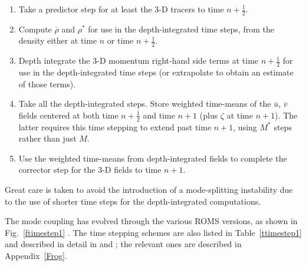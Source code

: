 \begin{enumerate}
  \item Take a predictor step for at least the 3-D tracers to time
  $n+\frac{1}{2}$.
  \item Compute $\overline{\rho}$ and
$\rho^*$ for use in the depth-integrated time steps, from the density
either at time $n$ or time $n+\frac{1}{2}$.
  \item Depth integrate the 3-D momentum right-hand side terms at
time $n+\frac{1}{2}$ for use in the depth-integrated time steps (or extrapolate
to obtain an estimate of those terms).
  \item Take all the depth-integrated steps. Store weighted
time-means of the $\overline{u}$, $\overline{v}$ fields centered at both
time $n+\frac{1}{2}$ and time $n+1$ (plus $\zeta$ at time $n+1$). The latter
requires this time stepping to extend past time $n+1$, using $M^*$ steps
rather than just $M$.
  \item Use the weighted time-means from depth-integrated fields to
complete the corrector step for the 3-D fields to time $n+1$.
\end{enumerate}
Great care is taken to avoid the introduction of a mode-splitting
instability due to the use of shorter time steps for the depth-integrated
computations.

The mode coupling has evolved through the various ROMS versions,
as shown in Fig.~\ref{ftimestep1} \citep[from][]{SS2008a}. The
time stepping
schemes are also listed in Table~\ref{ttimestep1} and described in
detail in \citet{SS2005} and \citet{SS2008b}; the relevant ones
are described in Appendix~\ref{Frog}.

